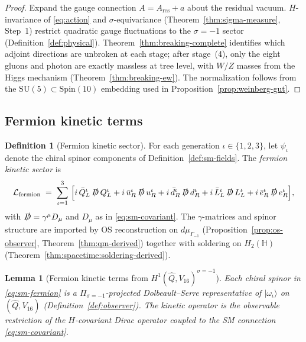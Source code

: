 \documentclass[aps,prd,onecolumn,amsmath,amssymb,nofootinbib,11pt]{revtex4-2}
\numberwithin{equation}{section}
\theoremstyle{plain}
\newtheorem{lemma}[theorem]{Lemma}
\theoremstyle{definition}
\newtheorem{definition}[theorem]{Definition}
\theoremstyle{remark}
\newcommand{\Quat}{\mathbb{H}}
\newcommand{\Spin}{\mathrm{Spin}}
\begin{document}
\begin{proof}
Expand the gauge connection $A=A_{\mathrm{res}}+a$ about the residual vacuum.
$H$-invariance of \eqref{eq:action} and $\sigma$-equivariance
(Theorem~\ref{thm:sigma-measure}, Step~1) restrict quadratic gauge
fluctuations to the $\sigma=-1$ sector (Definition~\ref{def:physical}).
Theorem~\ref{thm:breaking-complete} identifies which adjoint directions are
unbroken at each stage; after stage~(4), only the eight gluons and photon are
exactly massless at tree level, with $W/Z$ masses from the Higgs mechanism
(Theorem~\ref{thm:breaking-ew}). The normalization follows from the
$\mathrm{SU}(5)\subset\Spin(10)$ embedding used in
Proposition~\ref{prop:weinberg-gut}.
\end{proof}

\subsection{Fermion kinetic terms}
\label{sec:sm-lagrangian:fermion}

\begin{definition}[Fermion kinetic sector]\label{def:sm-fermion}
For each generation $\iota\in\{1,2,3\}$, let $\psi_{\iota}$ denote the chiral
spinor components of Definition~\ref{def:sm-fields}. The \emph{fermion kinetic
sector} is
\begin{equation}\label{eq:sm-fermion}
  \mathcal{L}_{\mathrm{fermion}}
  \;=\;
  \sum_{\iota=1}^{3}\;
  \Bigl[
    i\,\bar Q_L^\iota\,\slashed{D}\,Q_L^\iota
    + i\,\bar u_R^\iota\,\slashed{D}\,u_R^\iota
    + i\,\bar d_R^\iota\,\slashed{D}\,d_R^\iota
    + i\,\bar L_L^\iota\,\slashed{D}\,L_L^\iota
    + i\,\bar e_R^\iota\,\slashed{D}\,e_R^\iota
  \Bigr],
\end{equation}
with $\slashed{D}=\gamma^\mu D_\mu$ and $D_\mu$ as in \eqref{eq:sm-covariant}.
The $\gamma$-matrices and spinor structure are imported by OS reconstruction on
$d\mu_{\Gamma_{-1}}$ (Proposition~\ref{prop:os-observer}, Theorem~\ref{thm:qm-derived})
together with soldering on $H_2(\Quat)$
(Theorem~\ref{thm:spacetime:soldering-derived}).
\end{definition}

\begin{lemma}[Fermion kinetic terms from $H^1(\hat Q,V_{16})^{\sigma=-1}$]
\label{lem:sm-fermion-derived}
Each chiral spinor in \eqref{eq:sm-fermion} is a $\Pi_{\sigma=-1}$-projected
Dolbeault--Serre representative of $|\omega_\iota\rangle$ on
$(\hat Q,V_{16})$ (Definition~\ref{def:observer}). The kinetic operator is the
observable restriction of the $H$-covariant Dirac operator coupled to the SM
connection \eqref{eq:sm-covariant}.
\end{lemma}
\end{document}

